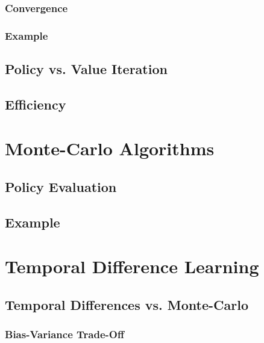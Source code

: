 		\subsection{Convergence} %

		\subsection{Example} %

	\section{Policy vs. Value Iteration} %

	\section{Efficiency} %

\chapter{Monte-Carlo Algorithms} %

	\section{Policy Evaluation} %

	\section{Example} %

\chapter{Temporal Difference Learning} %

	\section{Temporal Differences vs. Monte-Carlo} %

		\subsection{Bias-Variance Trade-Off} %

